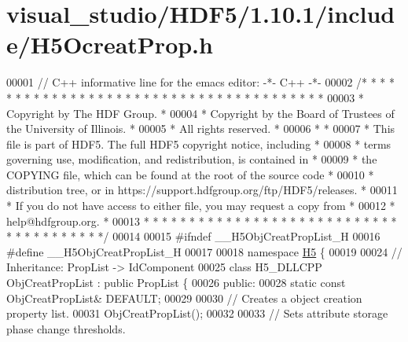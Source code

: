 \hypertarget{visual__studio_2_h_d_f5_21_810_81_2include_2_h5_ocreat_prop_8h_source}{}\section{visual\+\_\+studio/\+H\+D\+F5/1.10.1/include/\+H5\+Ocreat\+Prop.h}
\label{visual__studio_2_h_d_f5_21_810_81_2include_2_h5_ocreat_prop_8h_source}

\begin{DoxyCode}
00001 \textcolor{comment}{// C++ informative line for the emacs editor: -*- C++ -*-}
00002 \textcolor{comment}{/* * * * * * * * * * * * * * * * * * * * * * * * * * * * * * * * * * * * * * *}
00003 \textcolor{comment}{ * Copyright by The HDF Group.                                               *}
00004 \textcolor{comment}{ * Copyright by the Board of Trustees of the University of Illinois.         *}
00005 \textcolor{comment}{ * All rights reserved.                                                      *}
00006 \textcolor{comment}{ *                                                                           *}
00007 \textcolor{comment}{ * This file is part of HDF5.  The full HDF5 copyright notice, including     *}
00008 \textcolor{comment}{ * terms governing use, modification, and redistribution, is contained in    *}
00009 \textcolor{comment}{ * the COPYING file, which can be found at the root of the source code       *}
00010 \textcolor{comment}{ * distribution tree, or in https://support.hdfgroup.org/ftp/HDF5/releases.  *}
00011 \textcolor{comment}{ * If you do not have access to either file, you may request a copy from     *}
00012 \textcolor{comment}{ * help@hdfgroup.org.                                                        *}
00013 \textcolor{comment}{ * * * * * * * * * * * * * * * * * * * * * * * * * * * * * * * * * * * * * * */}
00014 
00015 \textcolor{preprocessor}{#ifndef \_\_H5ObjCreatPropList\_H}
00016 \textcolor{preprocessor}{#define \_\_H5ObjCreatPropList\_H}
00017 
00018 \textcolor{keyword}{namespace }\hyperlink{namespace_h5}{H5} \{
00019 
00024 \textcolor{comment}{//  Inheritance: PropList -> IdComponent}
00025 \textcolor{keyword}{class }H5\_DLLCPP ObjCreatPropList : \textcolor{keyword}{public} PropList \{
00026    \textcolor{keyword}{public}:
00028         \textcolor{keyword}{static} \textcolor{keyword}{const} ObjCreatPropList& DEFAULT;
00029 
00030         \textcolor{comment}{// Creates a object creation property list.}
00031         ObjCreatPropList();
00032 
00033         \textcolor{comment}{// Sets attribute storage phase change thresholds.}

\end{DoxyCode}
